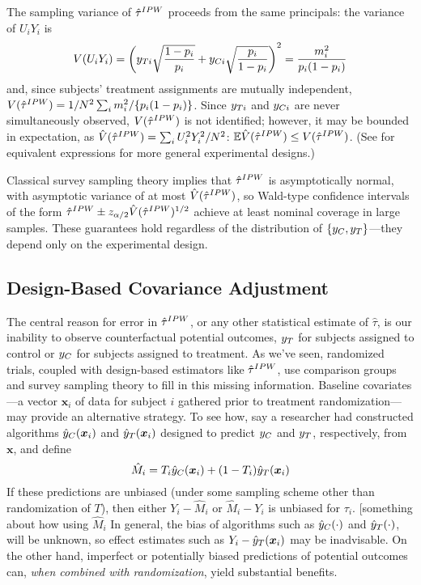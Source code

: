 The sampling variance of $\hat{\tau}^{IPW}$ proceeds from the same principals:
the variance of $U_iY_i$ is
\begin{equation}\label{eq:varTauHat1}
V(U_iY_i)=\left(y_{Ti}\sqrt{\frac{1-p_i}{p_i}}+y_{Ci}\sqrt{\frac{p_i}{1-p_i}}\right)^2=\frac{m_i^2}{p_i(1-p_i)}
\end{equation}
and, since  subjects' treatment assignments are mutually independent,
$V(\hat{\tau}^{IPW})=1/N^2\sum_im_i^2/\{p_i(1-p_i)\}$.
Since $y_{Ti} $ and $y_{Ci} $ are never simultaneously observed,
$V(\hat{\tau}^{IPW})$ is not identified; however, it may be bounded in expectation,
as $\hat{V}(\hat{\tau}^{IPW})=\sum_iU_i^2Y_i^2/N^2$:
$\mathbb{E}\hat{V}(\hat{\tau}^{IPW})\le V(\hat{\tau}^{IPW})$.
(See \citealt{aronowMiddleton} for equivalent expressions for more
general experimental designs.)

Classical survey sampling theory implies that $\hat{\tau}^{IPW}$ is
asymptotically normal, with asymptotic variance of at most
$\hat{V}(\hat{\tau}^{IPW})$, so Wald-type confidence intervals of the form
$\hat{\tau}^{IPW}\pm z_{\alpha/2}\hat{V}(\hat{\tau}^{IPW})^{1/2}$ achieve at least nominal coverage
in large samples.
These guarantees hold regardless of the distribution of
$\{y_C,y_T\}$---they depend only on the experimental design.


\subsection{Design-Based Covariance Adjustment}

The central reason for error in $\hat{\tau}^{IPW}$, or any other statistical
estimate of $\hat{\tau}$, is our inability to observe counterfactual
potential outcomes, $y_T$ for subjects assigned to control or $y_C$
for subjects assigned to treatment.
As we've seen, randomized trials, coupled with design-based estimators
like $\hat{\tau}^{IPW}$, use comparison groups and survey sampling theory to
fill in this missing information.
Baseline covariates---a vector $\bm{x}_i$ of data for subject $i$
gathered prior to treatment randomization---may provide an alternative
strategy.
To see how, say a researcher had constructed algorithms $\hat{y}_C(\bm{x}_i)$ and
$\hat{y}_T(\bm{x}_i)$ designed to predict $y_C$ and $y_T$, respectively, from
$\bm{x}$, and define
\begin{equation*}
\hat{M}_i=T_i\hat{y}_C(\bm{x}_i)+(1-T_i)\hat{y}_T(\bm{x}_i)
\end{equation*}
If these predictions are unbiased (under
some sampling scheme other than randomization of $T$), then either
$Y_i-\hat{M}_i$ or $\hat{M}_i-Y_i$ is unbiased for $\tau_i$.
[something about how using $\hat{M}_i$
In general, the bias of algorithms such as $\hat{y}_C(\cdot)$ and
$\hat{y}_T(\cdot)$, will be unknown, so effect estimates such as
$Y_i-\hat{y}_T(\bm{x}_i)$ may be inadvisable.
On the other hand, imperfect or potentially biased predictions of
potential outcomes can, \emph{when combined with randomization}, yield
substantial benefits.

